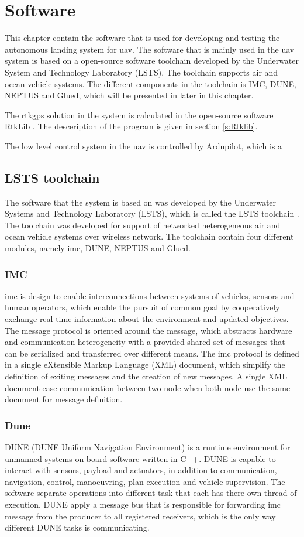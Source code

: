 \chapter{Software}
This chapter contain the software that is used for developing and testing the autonomous landing system for \gls{uav}. The software that is mainly used in the uav system is based on a open-source software toolchain developed by the Underwater System and Technology Laboratory (LSTS). The toolchain supports air and ocean vehicle systems. The different components in the toolchain is IMC, DUNE, NEPTUS and Glued, which will be presented in later in this chapter. 

The rtkgps solution in the system is calculated in the open-source software RtkLib \citep{takasu2009development}. The desceription of the program is given in section \ref{s:Rtklib}.

The low level control system in the uav is controlled by Ardupilot, which is a 
\section{LSTS toolchain}
The software that the system is based on was developed by the Underwater Systems and Technology Laboratory (LSTS), which is called the LSTS toolchain \citep{pinto2013lsts}. The toolchain was developed for support of networked heterogeneous air and ocean vehicle systems over wireless network. The toolchain contain four different modules, namely \gls{imc}, DUNE, NEPTUS and Glued.
\subsection{IMC}
\gls{imc} \citep{martins2009imc} is design to enable interconnections between systems of vehicles, sensors and human operators, which enable the pursuit of common goal by cooperatively exchange real-time information about the environment and updated objectives. The message protocol is oriented around the message, which abstracts hardware and communication heterogeneity with a provided shared set of messages that can be serialized and transferred over different means. The \gls{imc} protocol is defined in a single eXtensible Markup Language (XML) document, which simplify the definition of exiting messages and the creation of new messages. A single XML document ease communication between two node when both node use the same document for message definition. 
\subsection{Dune}
DUNE (DUNE Uniform Navigation Environment) is a runtime environment for unmanned systems on-board software written in C++. DUNE is capable to interact with sensors, payload and actuators, in addition to communication, navigation, control, manoeuvring, plan execution and vehicle supervision. The software separate operations into different task that each has there own thread of execution. DUNE apply a message bus that is responsible for forwarding \gls{imc} message from the producer to all registered receivers, which is the only way different DUNE tasks is communicating. 

